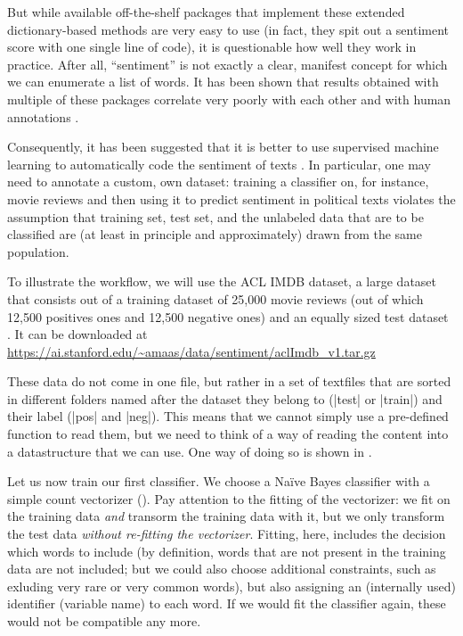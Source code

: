 But while available off-the-shelf packages that implement these
extended dictionary-based methods are very easy to use (in fact, they
spit out a sentiment score with one single line of code), it is
questionable how well they work in practice. After all, ``sentiment''
is not exactly a clear, manifest concept for which we can enumerate a
list of words. It has been shown that results obtained with multiple
of these packages correlate very poorly with each other and with human
annotations .

Consequently, it has been suggested that it is better to use
supervised machine learning to automatically code the sentiment of
texts \citep{Gonzalez-Bailon2015,vermeer2019seeing}. In particular,
one may need to annotate a custom, own dataset: training a classifier
on, for instance, movie reviews and then using it to predict sentiment
in political texts violates the assumption that training set, test
set, and the unlabeled data that are to be classified are (at least in
principle and approximately) drawn from the same population.

To illustrate the workflow, we will use the ACL IMDB dataset, a large
dataset that consists out of a training dataset of 25,000 movie
reviews (out of which 12,500 positives ones and 12,500 negative ones)
and an equally sized test dataset \citep{aclimdb}. It can be
downloaded at
\url{https://ai.stanford.edu/~amaas/data/sentiment/aclImdb_v1.tar.gz}


These data do not come in one file, but rather in a set of textfiles
that are sorted in different folders named after the dataset they
belong to (|test| or |train|) and their label (|pos| and |neg|). This
means that we cannot simply use a pre-defined function to read them,
but we need to think of a way of reading the content into a
datastructure that we can use. One way of doing so is shown in
.


Let us now train our first classifier. We choose a Na\"ive Bayes classifier with a simple count vectorizer ().
Pay attention to the fitting of the vectorizer: we fit on the training data \emph{and} transorm the training data with it, but we only transform the test data \emph{without re-fitting the vectorizer}. Fitting, here, includes the decision which words to include (by definition, words that are not present in the training data are not included; but we could also choose additional constraints, such as exluding very rare or very common words), but also assigning an (internally used) identifier (variable name) to each word. If we would fit the classifier again, these would not be compatible any more.

